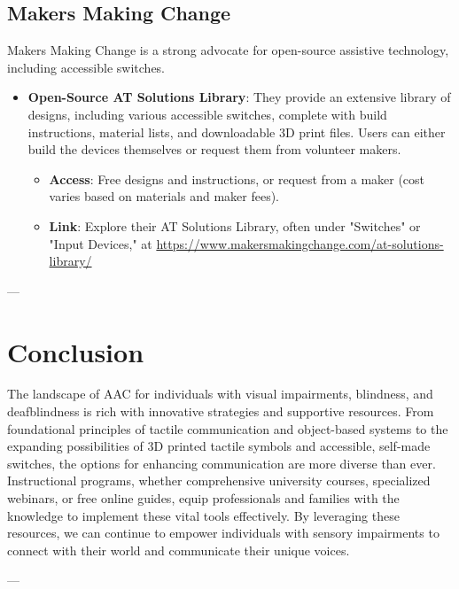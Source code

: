 \subsection{Makers Making Change}
Makers Making Change is a strong advocate for open-source assistive technology, including accessible switches.
\begin{itemize}
    \item \textbf{Open-Source AT Solutions Library}: They provide an extensive library of designs, including various accessible switches, complete with build instructions, material lists, and downloadable 3D print files. Users can either build the devices themselves or request them from volunteer makers.
    \begin{itemize}
        \item \textbf{Access}: Free designs and instructions, or request from a maker (cost varies based on materials and maker fees).
        \item \textbf{Link}: Explore their AT Solutions Library, often under "Switches" or "Input Devices," at \url{https://www.makersmakingchange.com/at-solutions-library/}
    \end{itemize}
\end{itemize}

---

\section{Conclusion}
The landscape of AAC for individuals with visual impairments, blindness, and deafblindness is rich with innovative strategies and supportive resources. From foundational principles of tactile communication and object-based systems to the expanding possibilities of 3D printed tactile symbols and accessible, self-made switches, the options for enhancing communication are more diverse than ever. Instructional programs, whether comprehensive university courses, specialized webinars, or free online guides, equip professionals and families with the knowledge to implement these vital tools effectively. By leveraging these resources, we can continue to empower individuals with sensory impairments to connect with their world and communicate their unique voices.

---

